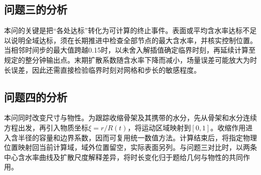 \subsection{问题三的分析}
本问的关键是把“各处达标”转化为可计算的终止事件。表面或平均含水率达标不足以说明全域达标，须在长期推进中检查全部节点的最大含水率，并核实控制位置。当相邻时间步的最大值跨越0.15\cunit 时，以未舍入解插值确定临界时刻，再延续计算至规定的整分钟输出点。末期扩散系数随含水率下降而减小，场量误差可能放大为时长误差，因此还需直接检验临界时刻对网格和步长的敏感程度。

\subsection{问题四的分析}
本问同时改变尺寸与物性。为跟踪收缩骨架及其携带的水分，先从骨架和水分连续方程出发，再引入物质坐标$\xi=r/R(t)$，将运动区域映射到$[0,1]$。收缩作用进入含半径的容量和边界系数，因而可复用统一数值方法。计算结束后，将指定物理位置映射回当前计算域，域外位置留空，实际表面另列。与问题三对比时，以两条中心含水率曲线及扩散尺度解释差异，将时长变化归于题给几何与物性的共同作用。

\clearpage
